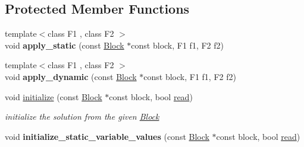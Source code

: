 \subsection*{Protected Member Functions}
\begin{DoxyCompactItemize}
\item 
\mbox{\label{class_s_m_spp__di__unipi__it_1_1_col_variable_solution_af79fb89da1093c64395cbfd03c0fb468}} 
{\footnotesize template$<$class F1 , class F2 $>$ }\\void {\bfseries apply\+\_\+static} (const \mbox{\hyperlink{class_s_m_spp__di__unipi__it_1_1_block}{Block}} $\ast$const block, F1 f1, F2 f2)
\item 
\mbox{\label{class_s_m_spp__di__unipi__it_1_1_col_variable_solution_a9512c181f06ec4712085a97d27ed559a}} 
{\footnotesize template$<$class F1 , class F2 $>$ }\\void {\bfseries apply\+\_\+dynamic} (const \mbox{\hyperlink{class_s_m_spp__di__unipi__it_1_1_block}{Block}} $\ast$const block, F1 f1, F2 f2)
\item 
void \mbox{\hyperlink{class_s_m_spp__di__unipi__it_1_1_col_variable_solution_aa887c8a803bff8a2a7e76e4e809a6f8d}{initialize}} (const \mbox{\hyperlink{class_s_m_spp__di__unipi__it_1_1_block}{Block}} $\ast$const block, bool \mbox{\hyperlink{class_s_m_spp__di__unipi__it_1_1_col_variable_solution_a13487898d41f593b3cc0ae6a69feb3ff}{read}})
\begin{DoxyCompactList}\small\item\em initialize the solution from the given \mbox{\hyperlink{class_s_m_spp__di__unipi__it_1_1_block}{Block}} \end{DoxyCompactList}\item 
\mbox{\label{class_s_m_spp__di__unipi__it_1_1_col_variable_solution_a0e785beabf075836d43d3d270c411b68}} 
void {\bfseries initialize\+\_\+static\+\_\+variable\+\_\+values} (const \mbox{\hyperlink{class_s_m_spp__di__unipi__it_1_1_block}{Block}} $\ast$const block, bool \mbox{\hyperlink{class_s_m_spp__di__unipi__it_1_1_col_variable_solution_a13487898d41f593b3cc0ae6a69feb3ff}{read}})
\item 
\mbox{\label{class_s_m_spp__di__unipi__it_1_1_col_variable_solution_ad855b24e1816c131778570cd269f42ce}} 

\end{DoxyCompactItemize}
